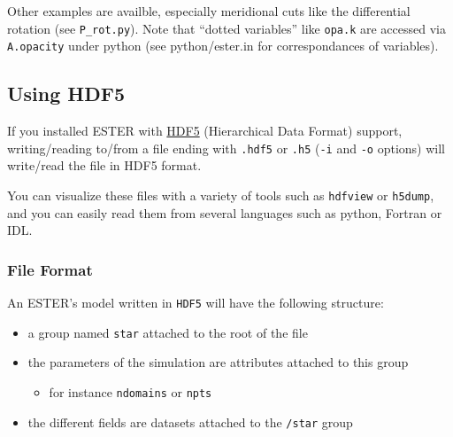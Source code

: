 Other examples are availble, especially meridional cuts like the
differential rotation (see \texttt{P\_rot.py}). Note that ``dotted
variables'' like \verb|opa.k| are accessed via \verb|A.opacity| under
python (see python/ester.in for correspondances of variables).

\subsection{Using HDF5}
If you installed ESTER with
\href{http://www.hdfgroup.org/HDF5/whatishdf5.html}{HDF5} (Hierarchical Data
Format) support, writing/reading to/from a file ending with \texttt{.hdf5} or
\texttt{.h5} (\texttt{-i} and \texttt{-o} options) will write/read the file in
HDF5 format.  

You can visualize these files with a variety of tools such as \texttt{hdfview}
or \texttt{h5dump}, and you can easily read them from several languages such as
python, Fortran or IDL.

\subsubsection{File Format}
An ESTER's model written in \texttt{HDF5} will have the following structure: 
\begin{itemize}
    \item a group named \texttt{star} attached to the root of the file
    \item the parameters of the simulation are attributes attached to this group
        \begin{itemize}
            \item for instance \texttt{ndomains} or \texttt{npts}
        \end{itemize}
    \item the different fields are datasets attached to the \texttt{/star} group
\end{itemize}

